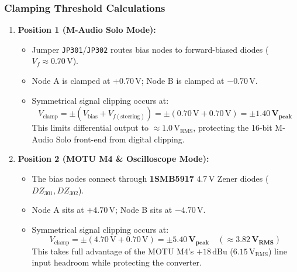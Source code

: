 \documentclass[11pt, letterpaper]{article}
\begin{document}
\subsubsection{Clamping Threshold Calculations}
\begin{enumerate}[label=\textbf{\arabic*.}]
    \item \textbf{Position 1 (M-Audio Solo Mode):}
    \begin{itemize}
        \item Jumper \texttt{JP301}/\texttt{JP302} routes bias nodes to forward-biased diodes ($V_f \approx 0.70\,\text{V}$).
        \item Node A is clamped at $+0.70\,\text{V}$; Node B is clamped at $-0.70\,\text{V}$.
        \item Symmetrical signal clipping occurs at:
        \begin{equation}
            V_{\text{clamp}} = \pm(V_{\text{bias}} + V_{f(\text{steering})}) = \pm(0.70\,\text{V} + 0.70\,\text{V}) = \mathbf{\pm 1.40\,\text{V}_{\text{peak}}}
        \end{equation}
        This limits differential output to $\approx 1.0\,\text{V}_{\text{RMS}}$, protecting the 16-bit M-Audio Solo front-end from digital clipping.
    \end{itemize}
    \item \textbf{Position 2 (MOTU M4 \& Oscilloscope Mode):}
    \begin{itemize}
        \item The bias nodes connect through \textbf{1SMB5917} $4.7\,\text{V}$ Zener diodes ($DZ_{301}, DZ_{302}$).
        \item Node A sits at $+4.70\,\text{V}$; Node B sits at $-4.70\,\text{V}$.
        \item Symmetrical signal clipping occurs at:
        \begin{equation}
            V_{\text{clamp}} = \pm(4.70\,\text{V} + 0.70\,\text{V}) = \mathbf{\pm 5.40\,\text{V}_{\text{peak}}} \quad (\mathbf{\approx 3.82\,\text{V}_{\text{RMS}}})
        \end{equation}
        This takes full advantage of the MOTU M4's $+18\,\text{dBu}$ ($6.15\,\text{V}_{\text{RMS}}$) line input headroom while protecting the converter.
    \end{itemize}
\end{enumerate}
\end{document}
